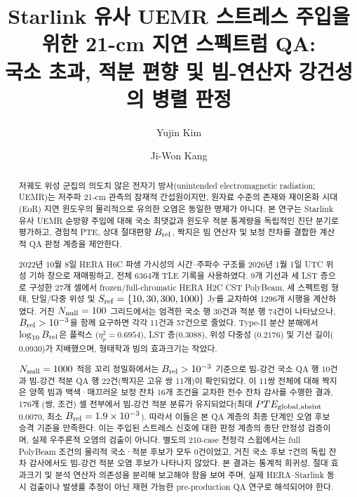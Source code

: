 \documentclass[final,5p,times]{elsarticle}
\newcommand{\NTLERecords}{6364}
\newcommand{\NCells}{27}
\newcommand{\NMainRows}{1296}
\newcommand{\NNullMain}{100}
\newcommand{\NNullTail}{1000}
\newcommand{\NMainLocalStrict}{30}
\newcommand{\NMainIntStrict}{74}
\newcommand{\NMainLocalPhysEthree}{11}
\newcommand{\NMainIntPhysEthree}{57}
\newcommand{\AnovaFluxEta}{0.6954}
\newcommand{\AnovaLSTEta}{0.3088}
\newcommand{\AnovaMultEta}{0.2176}
\newcommand{\AnovaBaseEta}{0.0930}
\newcommand{\NLocalTailBeamRobustEthree}{10}
\newcommand{\NIntTailBeamRobustEthree}{22}
\newcommand{\NCandidateAudit}{7}
\newcommand{\NIntAuditPairs}{11}
\newcommand{\NIntAuditConds}{16}
\newcommand{\NIntAuditCells}{176}
\newcommand{\IntAuditMaxPTE}{0.0070}
\newcommand{\IntAuditMinBrel}{1.9\times10^{-3}}
\begin{document}
\begin{frontmatter}

\title{Starlink 유사 UEMR 스트레스 주입을 위한 21-cm 지연 스펙트럼 QA:\\
국소 초과, 적분 편향 및 빔-연산자 강건성의 병렬 판정}

\author[jnu]{Yujin Kim}
\author[jnu]{Ji-Won Kang}

\begin{abstract}
저궤도 위성 군집의 의도치 않은 전자기 방사(unintended
electromagnetic radiation; UEMR)는 저주파 21-cm 관측의 잠재적
간섭원이지만, 원자료 수준의 존재와 재이온화 시대(EoR) 지연
윈도우의 물리적으로 유의한 오염은 동일한 명제가 아니다. 본 연구는
Starlink 유사 UEMR 순방향 주입에 대해 국소 최댓값과 윈도우 적분
통계량을 독립적인 진단 분기로 평가하고, 경험적 PTE, 상대 절대편향
$B_{\rm rel}$, 짝지은 빔 연산자 및 보정 잔차를 결합한 계산적 QA
판정 계층을 제안한다.

2022년 10월 8일 HERA H6C 파생 가시성의 시간--주파수 구조를
2026년 1월 1일 UTC 위성 기하 창으로 재매핑하고, 전체
\NTLERecords{}개 TLE 기록을 사용하였다. 9개 기선과 세 LST 층으로
구성한 \NCells{}개 셀에서 frozen/full-chromatic HERA H2C CST
PolyBeam, 세 스펙트럼 형태, 단일/다중 위성 및
$S_{\rm ref}=\{10,30,300,1000\}$ Jy를 교차하여 \NMainRows{}개
시행을 계산하였다. 거친 $N_{\rm null}=\NNullMain$ 그리드에서는
엄격한 국소 행 \NMainLocalStrict{}건과 적분 행 \NMainIntStrict{}건이
나타났으나, $B_{\rm rel}>10^{-3}$을 함께 요구하면 각각
\NMainLocalPhysEthree{}건과 \NMainIntPhysEthree{}건으로 줄었다.
Type-II 분산 분해에서 $\log_{10}B_{\rm rel}$은 플럭스
($\eta_p^2=\AnovaFluxEta$), LST 층($\AnovaLSTEta$), 위성 다중성
($\AnovaMultEta$) 및 기선 길이($\AnovaBaseEta$)가 지배했으며,
형태학과 빔의 효과크기는 작았다.

$N_{\rm null}=\NNullTail$ 적응 꼬리 정밀화에서는
$B_{\rm rel}>10^{-3}$ 기준으로 빔-강건 국소 QA 행
\NLocalTailBeamRobustEthree{}건과 빔-강건 적분 QA 행
\NIntTailBeamRobustEthree{}건(짝지은 고유 쌍 \NIntAuditPairs{}개)이
확인되었다. 이 \NIntAuditPairs{}쌍 전체에 대해 짝지은 양쪽 빔과
백색·매끄러운 보정 잔차 \NIntAuditConds{}개 조건을 교차한 전수
잔차 감사를 수행한 결과, \NIntAuditCells{}개 (쌍, 조건) 셀 전부에서
빔-강건 적분 분류가 유지되었다(최대 $PTE_{\rm global,absint}$
\IntAuditMaxPTE{}, 최소 $B_{\rm rel}=\IntAuditMinBrel$). 따라서
이들은 본 QA 계층의 최종 단계인 오염 후보 승격 기준을 만족한다.
이는 주입된 스트레스 신호에 대한 판정 계층의 종단 안정성 검증이며,
실제 우주론적 오염의 검출이 아니다. 별도의 210-case 천정각
스윕에서는 full PolyBeam 조건의 물리적 국소·적분 후보가 모두
0건이었고, 거친 국소 후보 \NCandidateAudit{}건의 독립 잔차
감사에서도 빔-강건 적분 오염 후보가 나타나지 않았다. 본 결과는
통계적 희귀성, 절대 효과크기 및 분석 연산자 의존성을 분리해
보고해야 함을 보여 주며, 실제 HERA--Starlink 동시 검출이나 발생률
추정이 아닌 재현 가능한 pre-production QA 연구로 해석되어야 한다.
\end{abstract}


\end{frontmatter}
\end{document}
